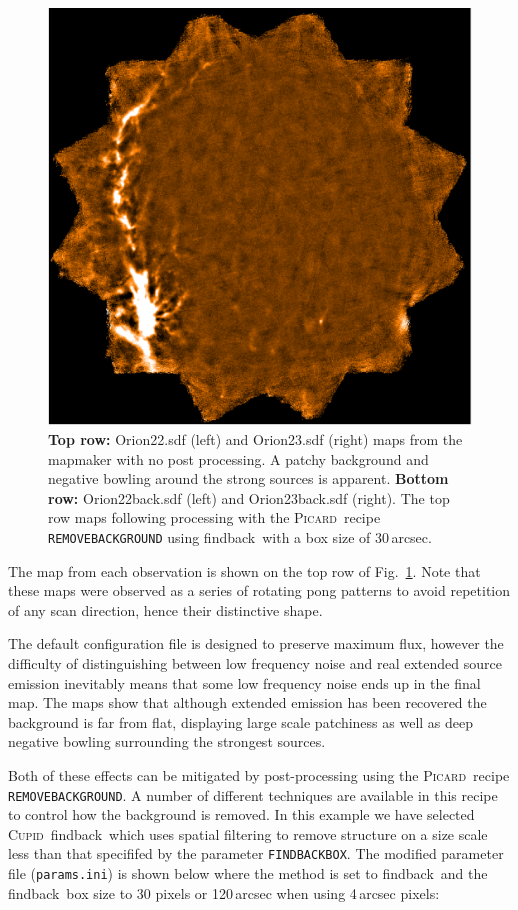 \documentclass[twoside,11pt]{article}
\newcommand{\xref}[3]{#1}
\renewcommand{\_}{\texttt{\symbol{95}}}
\newcommand{\cupid}{\xref{\textsc{Cupid}}{sun255}{}}
\newcommand{\picard}{\xref{\textsc{Picard}}{sun231}{}}
\newcommand{\drrecipe}[1]{\texttt{#1}}
\newcommand{\task}[1]{\textsf{#1}}
\newcommand{\param}[1]{\texttt{#1}}
\newcommand{\findback}{\xref{\task{findback}}{sun255}{FINDBACK}}
\begin{document}
\begin{figure}
\begin{center}
\includegraphics[width=0.49\hsize]{sc19_map23_back.eps}
\caption{\textbf{Top row:} Orion22.sdf (left) and Orion23.sdf (right) maps from
  the mapmaker with no post processing. A patchy background and
  negative bowling around the strong sources is apparent. \textbf{Bottom row:}
  Orion22\_back.sdf (left) and Orion23\_back.sdf (right). The top row
  maps following processing with the \picard\ recipe \drrecipe{REMOVE\_BACKGROUND}
  using \findback\ with a box size of 30\,arcsec.}
\label{fig:orionmakemap}
\end{center}
\end{figure}

The map from each observation is shown on the top row of
Fig.~\ref{fig:orionmakemap}. Note that these maps were observed as a
series of rotating pong patterns to avoid repetition of any scan
direction, hence their distinctive shape.

The default configuration file is designed to preserve maximum flux,
however the difficulty of distinguishing between low frequency noise
and real extended source emission inevitably means that some low
frequency noise ends up in the final map. The maps show that although
extended emission has been recovered the background is far from flat,
displaying large scale patchiness as well as deep negative bowling
surrounding the strongest sources.

Both of these effects can be mitigated by post-processing
using the \picard\ recipe \drrecipe{REMOVE\_BACKGROUND}. A number of
different techniques are available in this recipe to control how the
background is removed.  In this example we have selected \cupid\
\findback\ which uses spatial filtering to remove structure on a size
scale less than that specififed by the
parameter \param{FINDBACK\_BOX}.  The modified parameter file
(\texttt{params.ini}) is shown below where the method is set to
\findback\ and the \findback\ box size to 30 pixels or 120\,arcsec
when using 4\,arcsec pixels:
\end{document}
